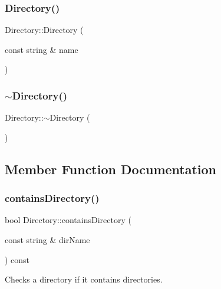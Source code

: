 \subsubsection{\texorpdfstring{Directory()}{Directory()}}
{\footnotesize\ttfamily Directory\+::\+Directory (\begin{DoxyParamCaption}\item[{const string \&}]{name }\end{DoxyParamCaption})\hspace{0.3cm}{\ttfamily [inline]}}

\mbox{\label{class_directory_affbde8714685c61601421097d621341d}} 
\subsubsection{\texorpdfstring{$\sim$\+Directory()}{~Directory()}}
{\footnotesize\ttfamily Directory\+::$\sim$\+Directory (\begin{DoxyParamCaption}{ }\end{DoxyParamCaption})\hspace{0.3cm}{\ttfamily [inline]}}



\subsection{Member Function Documentation}
\mbox{\label{class_directory_ae84d7cdbbea5138b808dca098c28c820}} 
\subsubsection{\texorpdfstring{contains\+Directory()}{containsDirectory()}}
{\footnotesize\ttfamily bool Directory\+::contains\+Directory (\begin{DoxyParamCaption}\item[{const string \&}]{dir\+Name }\end{DoxyParamCaption}) const}



Checks a directory if it contains directories. 

\mbox{\label{class_directory_a0286ef72f0d7cd5a0be7c15c0db46942}} 
